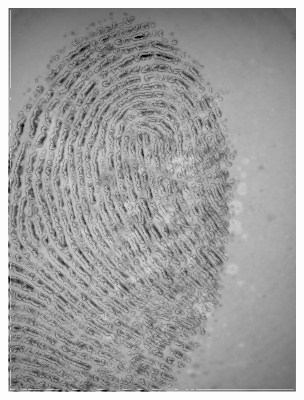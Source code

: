 \documentclass{beamer}
\begin{document}
{\begin{figure}[!ht]
\begin{subfigure}[ht]{0.15\textwidth}
            \includegraphics[width=\textwidth]{fingerprints/2004Db4a/1_2_background.jpg}
        \end{subfigure}
        \qquad
        \begin{subfigure}[ht]{0.15\textwidth}

\end{subfigure}
\end{figure}}
\end{document}
